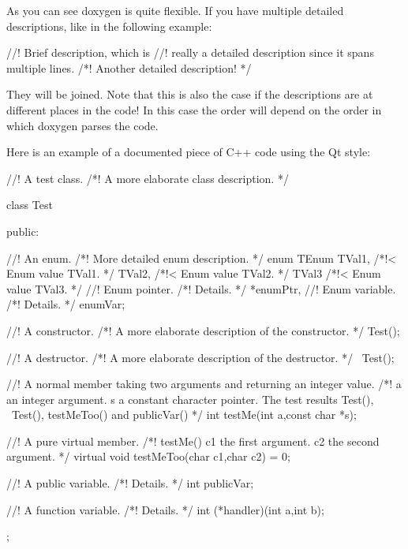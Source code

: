 As you can see doxygen is quite flexible. If you have multiple detailed descriptions, like in the following example:

\begin{DoxyVerb}
//! Brief description, which is
//! really a detailed description since it spans multiple lines.
/*! Another detailed description!
 */
\end{DoxyVerb}


They will be joined. Note that this is also the case if the descriptions are at different places in the code! In this case the order will depend on the order in which doxygen parses the code.

Here is an example of a documented piece of C++ code using the Qt style: 
\begin{DoxyCodeInclude}
//!  A test class. 
/*!
  A more elaborate class description.
*/

class Test
{
  public:

    //! An enum.
    /*! More detailed enum description. */
    enum TEnum { 
                 TVal1, /*!< Enum value TVal1. */  
                 TVal2, /*!< Enum value TVal2. */  
                 TVal3  /*!< Enum value TVal3. */  
               } 
         //! Enum pointer.
         /*! Details. */
         *enumPtr, 
         //! Enum variable.
         /*! Details. */
         enumVar;  
    
    //! A constructor.
    /*!
      A more elaborate description of the constructor.
    */
    Test();

    //! A destructor.
    /*!
      A more elaborate description of the destructor.
    */
   ~Test();
    
    //! A normal member taking two arguments and returning an integer value.
    /*!
      \param a an integer argument.
      \param s a constant character pointer.
      \return The test results
      \sa Test(), ~Test(), testMeToo() and publicVar()
    */
    int testMe(int a,const char *s);
       
    //! A pure virtual member.
    /*!
      \sa testMe()
      \param c1 the first argument.
      \param c2 the second argument.
    */
    virtual void testMeToo(char c1,char c2) = 0;
   
    //! A public variable.
    /*!
      Details.
    */
    int publicVar;
       
    //! A function variable.
    /*!
      Details.
    */
    int (*handler)(int a,int b);
};

\end{DoxyCodeInclude}
 

